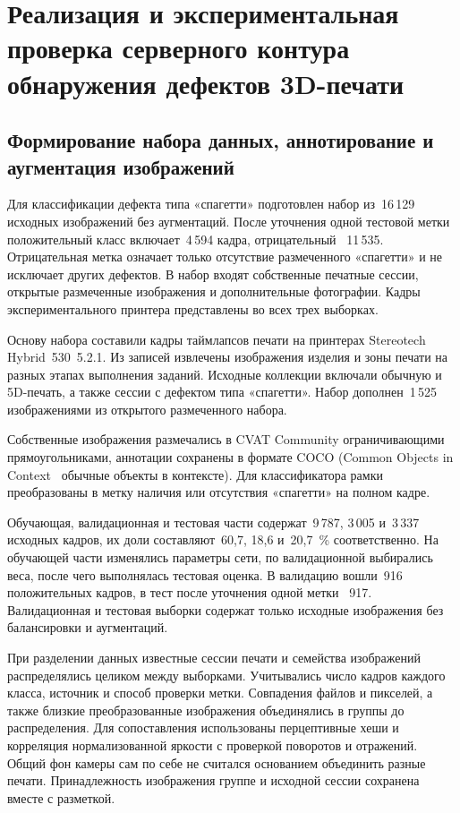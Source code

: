 \chapter{Реализация и экспериментальная проверка серверного контура обнаружения дефектов 3D-печати}

\section{Формирование набора данных, аннотирование и аугментация изображений}

Для классификации дефекта типа «спагетти» подготовлен набор из~16\,129 исходных изображений без аугментаций. После уточнения одной тестовой метки положительный класс включает~4\,594 кадра, отрицательный~\textemdash{} 11\,535. Отрицательная метка означает только отсутствие размеченного «спагетти» и не исключает других дефектов. В набор входят собственные печатные сессии, открытые размеченные изображения и дополнительные фотографии. Кадры экспериментального принтера представлены во всех трех выборках.

Основу набора составили кадры таймлапсов печати на принтерах Stereotech Hybrid~530~5.2.1. Из записей извлечены изображения изделия и зоны печати на разных этапах выполнения заданий. Исходные коллекции включали обычную и 5D-печать, а также сессии с дефектом типа «спагетти». Набор дополнен~1\,525 изображениями из открытого размеченного набора.

Собственные изображения размечались в CVAT Community ограничивающими прямоугольниками, аннотации сохранены в формате COCO (Common Objects in Context~\textemdash{} обычные объекты в контексте). Для классификатора рамки преобразованы в метку наличия или отсутствия «спагетти» на полном кадре.

Обучающая, валидационная и тестовая части содержат~9\,787, 3\,005 и~3\,337 исходных кадров, их доли составляют~60,7, 18,6 и~20,7~\% соответственно. На обучающей части изменялись параметры сети, по валидационной выбирались веса, после чего выполнялась тестовая оценка. В валидацию вошли~916 положительных кадров, в тест после уточнения одной метки~\textemdash{} 917. Валидационная и тестовая выборки содержат только исходные изображения без балансировки и аугментаций.

При разделении данных известные сессии печати и семейства изображений распределялись целиком между выборками. Учитывались число кадров каждого класса, источник и способ проверки метки. Совпадения файлов и пикселей, а также близкие преобразованные изображения объединялись в группы до распределения. Для сопоставления использованы перцептивные хеши и корреляция нормализованной яркости с проверкой поворотов и отражений. Общий фон камеры сам по себе не считался основанием объединить разные печати. Принадлежность изображения группе и исходной сессии сохранена вместе с разметкой.

